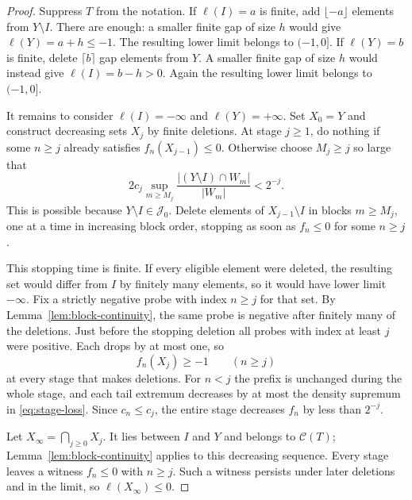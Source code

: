 \begin{proof}
Suppress $T$ from the notation. If $\ell(I)=a$ is finite, add
$\lfloor-a\rfloor$ elements from $Y\setminus I$. There are enough:
a smaller finite gap of size $h$ would give
$\ell(Y)=a+h\le-1$. The resulting lower limit belongs to $(-1,0]$.
If $\ell(Y)=b$ is finite, delete $\lceil b\rceil$ gap elements from
$Y$. A smaller finite gap of size $h$ would instead give
$\ell(I)=b-h>0$. Again the resulting lower limit belongs to $(-1,0]$.

It remains to consider $\ell(I)=-\infty$ and $\ell(Y)=+\infty$.
Set $X_0=Y$ and construct decreasing sets $X_j$ by finite deletions.
At stage $j\ge1$, do nothing if some $n\ge j$ already satisfies
$f_n(X_{j-1})\le0$. Otherwise choose $M_j\ge j$ so large that
\begin{equation}\label{eq:stage-loss}
 2c_j\sup_{m\ge M_j}
       \frac{|(Y\setminus I)\cap W_m|}{|W_m|}<2^{-j}.
\end{equation}
This is possible because $Y\setminus I\in\mathcal J_0$.
Delete elements of $X_{j-1}\setminus I$ in blocks $m\ge M_j$, one
at a time in increasing block order, stopping as soon as
$f_n\le0$ for some $n\ge j$.

This stopping time is finite. If every eligible element were deleted,
the resulting set would differ from $I$ by finitely many elements,
so it would have lower limit $-\infty$. Fix a strictly negative probe
with index $n\ge j$ for that set. By
Lemma~\ref{lem:block-continuity}, the same probe is negative after
finitely many of the deletions. Just before the stopping deletion all
probes with index at least $j$ were positive. Each drops by at most
one, so
\begin{equation}\label{eq:stage-reset}
 f_n(X_j)\ge-1\qquad(n\ge j)
\end{equation}
at every stage that makes deletions. For $n<j$ the prefix is unchanged
during the whole stage, and each tail extremum decreases by at most
the density supremum in \eqref{eq:stage-loss}. Since $c_n\le c_j$,
the entire stage decreases $f_n$ by less than $2^{-j}$.

Let $X_\infty=\bigcap_{j\ge0}X_j$. It lies between $I$ and $Y$ and
belongs to $\mathcal C(T)$; Lemma~\ref{lem:block-continuity} applies
to this decreasing sequence. Every stage leaves a witness
$f_n\le0$ with $n\ge j$. Such a witness persists under later
deletions and in the limit, so $\ell(X_\infty)\le0$.


\end{proof}
